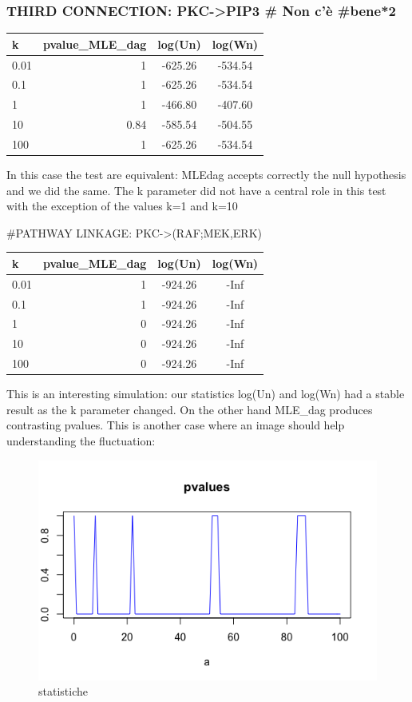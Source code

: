\documentclass[
]{article}
\begin{document}
\hypertarget{third-connection-pkc-pip3-non-cuxe8-bene2-1}{%
\subsubsection{THIRD CONNECTION: PKC-\textgreater PIP3 \# Non c'è
\#bene*2}\label{third-connection-pkc-pip3-non-cuxe8-bene2-1}}

\begin{longtable}[]{@{}lrcc@{}}
\toprule
k & pvalue\_MLE\_dag & log(Un) & log(Wn)\tabularnewline
\midrule
\endhead
0.01 & 1 & -625.26 & -534.54\tabularnewline
0.1 & 1 & -625.26 & -534.54\tabularnewline
1 & 1 & -466.80 & -407.60\tabularnewline
10 & 0.84 & -585.54 & -504.55\tabularnewline
100 & 1 & -625.26 & -534.54\tabularnewline
\bottomrule
\end{longtable}

In this case the test are equivalent: MLEdag accepts correctly the null
hypothesis and we did the same. The k parameter did not have a central
role in this test with the exception of the values k=1 and k=10

\#PATHWAY LINKAGE: PKC-\textgreater(RAF;MEK,ERK)

\begin{longtable}[]{@{}lrcc@{}}
\toprule
k & pvalue\_MLE\_dag & log(Un) & log(Wn)\tabularnewline
\midrule
\endhead
0.01 & 1 & -924.26 & -Inf\tabularnewline
0.1 & 1 & -924.26 & -Inf\tabularnewline
1 & 0 & -924.26 & -Inf\tabularnewline
10 & 0 & -924.26 & -Inf\tabularnewline
100 & 0 & -924.26 & -Inf\tabularnewline
\bottomrule
\end{longtable}

This is an interesting simulation: our statistics log(Un) and log(Wn)
had a stable result as the k parameter changed. On the other hand
MLE\_dag produces contrasting pvalues. This is another case where an
image should help understanding the fluctuation:

\begin{figure}
\centering
\includegraphics{data/statistics_images/Part6.4.png}
\caption{statistiche}
\end{figure}
\end{document}
